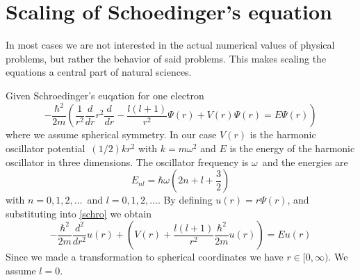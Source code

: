 \documentclass[%
reprint,
nofootinbib,
amsmath,amssymb,
aps,
]{revtex4-1}
\begin{document}
\section{Scaling of Schoedinger's equation}\label{AppB}%
In most cases we are not interested in the actual numerical values of physical problems, but rather the behavior of said problems. This makes scaling the equations a central part of natural sciences. 

Given Schroedinger's euqation for one electron
\begin{equation}\label{schro}
	-\frac{\hbar^2}{2m}\left(\frac{1}{r^2}\frac{d}{dr}r^2\frac{d}{dr}- \frac{l(l+1)}{r^2}\Psi(r) + V(r)\Psi(r) = E\Psi(r)\right)
\end{equation}
where we assume spherical symmetry. In our case $V(r)$ is the harmonic oscillator potential $(1/2)kr^2$ with $k=m\omega^2$ and $E$ is the energy of the harmonic oscillator in three dimensions. The oscillator frequency is $\omega$ and the energies are 
\begin{equation}
	E_{nl} = \hbar \omega\left(2n + l + \frac{3}{2}\right)
\end{equation}
with $n = 0,1,2,\dots $ and $l = 0,1,2,\dots$. 
By defining $u(r) = r\Psi(r)$, and substituting into \ref{schro} we obtain 
\begin{equation}
	-\frac{\hbar^2}{2m}\frac{d^2}{dr^2}u(r) + \left(V(r)+\frac{l(l+1)}{r^2}\frac{\hbar^2}{2m}u(r)\right)= Eu(r)
\end{equation}
Since we made a transformation to spherical coordinates we have $r \in [0,\infty)$. We assume $l = 0$. 
\end{document}
